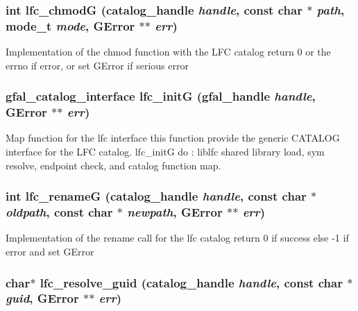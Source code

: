 \subsubsection{\setlength{\rightskip}{0pt plus 5cm}int lfc\_\-chmod\-G (catalog\_\-handle {\em handle}, const char $\ast$ {\em path}, mode\_\-t {\em mode}, GError $\ast$$\ast$ {\em err})}\label{gfal__common__lfc_8c_f40927feaad58de76b5406eb828102a6}


Implementation of the chmod function with the LFC catalog return 0 or the errno if error, or set GError if serious error 
\subsubsection{\setlength{\rightskip}{0pt plus 5cm}gfal\_\-catalog\_\-interface lfc\_\-init\-G (gfal\_\-handle {\em handle}, GError $\ast$$\ast$ {\em err})}\label{gfal__common__lfc_8c_18fc1e787694363fd5457f9b8f020cf8}


Map function for the lfc interface this function provide the generic CATALOG interface for the LFC catalog. lfc\_\-init\-G do : liblfc shared library load, sym resolve, endpoint check, and catalog function map. 
\subsubsection{\setlength{\rightskip}{0pt plus 5cm}int lfc\_\-rename\-G (catalog\_\-handle {\em handle}, const char $\ast$ {\em oldpath}, const char $\ast$ {\em newpath}, GError $\ast$$\ast$ {\em err})}\label{gfal__common__lfc_8c_cb750f4f936abd772a5f53f5b1fbdaec}


Implementation of the rename call for the lfc catalog return 0 if success else -1 if error and set GError 
\subsubsection{\setlength{\rightskip}{0pt plus 5cm}char$\ast$ lfc\_\-resolve\_\-guid (catalog\_\-handle {\em handle}, const char $\ast$ {\em guid}, GError $\ast$$\ast$ {\em err})}\label{gfal__common__lfc_8c_b8943f8f5fd7211851bf7732d9c3b50b}


